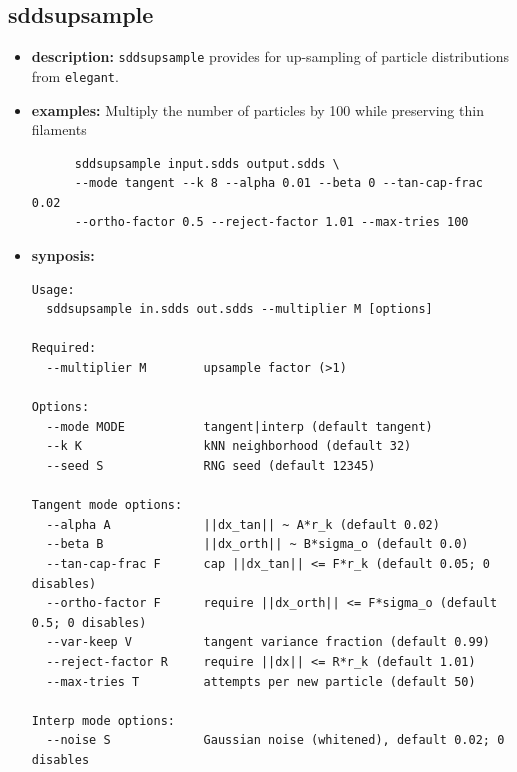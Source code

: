 \documentclass[11pt]{article}
\begin{document}
\subsection{sddsupsample}
\label{sddsupsample}
\begin{itemize}
  \item \textbf{description:} \verb|sddsupsample| provides for up-sampling of particle distributions from \verb|elegant|.
  \item \textbf{examples:} Multiply the number of particles by 100 while preserving thin filaments
    \begin{verbatim}
      sddsupsample input.sdds output.sdds \
      --mode tangent --k 8 --alpha 0.01 --beta 0 --tan-cap-frac 0.02
      --ortho-factor 0.5 --reject-factor 1.01 --max-tries 100
    \end{verbatim}
  \item \textbf{synposis:}
\begin{verbatim}
Usage:
  sddsupsample in.sdds out.sdds --multiplier M [options]

Required:
  --multiplier M        upsample factor (>1)

Options:
  --mode MODE           tangent|interp (default tangent)
  --k K                 kNN neighborhood (default 32)
  --seed S              RNG seed (default 12345)

Tangent mode options:
  --alpha A             ||dx_tan|| ~ A*r_k (default 0.02)
  --beta B              ||dx_orth|| ~ B*sigma_o (default 0.0)
  --tan-cap-frac F      cap ||dx_tan|| <= F*r_k (default 0.05; 0 disables)
  --ortho-factor F      require ||dx_orth|| <= F*sigma_o (default 0.5; 0 disables)
  --var-keep V          tangent variance fraction (default 0.99)
  --reject-factor R     require ||dx|| <= R*r_k (default 1.01)
  --max-tries T         attempts per new particle (default 50)

Interp mode options:
  --noise S             Gaussian noise (whitened), default 0.02; 0 disables

\end{verbatim}


\end{itemize}
\end{document}
